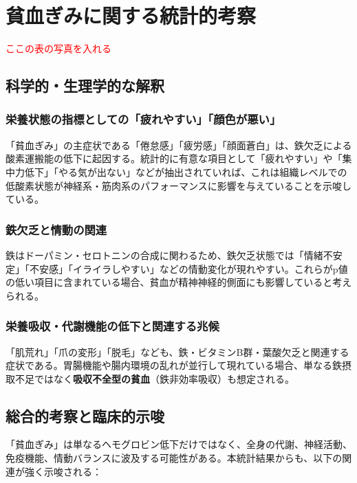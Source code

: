 \documentclass[a4paper,12pt]{article}
\begin{document}
\section{貧血ぎみに関する統計的考察}

\textcolor{red}{ここの表の写真を入れる}

\subsection*{科学的・生理学的な解釈}

\subsubsection*{栄養状態の指標としての「疲れやすい」「顔色が悪い」}

「貧血ぎみ」の主症状である「倦怠感」「疲労感」「顔面蒼白」は、鉄欠乏による酸素運搬能の低下に起因する。統計的に有意な項目として「疲れやすい」や「集中力低下」「やる気が出ない」などが抽出されていれば、これは組織レベルでの低酸素状態が神経系・筋肉系のパフォーマンスに影響を与えていることを示唆している。

\subsubsection*{鉄欠乏と情動の関連}

鉄はドーパミン・セロトニンの合成に関わるため、鉄欠乏状態では「情緒不安定」「不安感」「イライラしやすい」などの情動変化が現れやすい。これらがp値の低い項目に含まれている場合、貧血が精神神経的側面にも影響していると考えられる。

\subsubsection*{栄養吸収・代謝機能の低下と関連する兆候}

「肌荒れ」「爪の変形」「脱毛」なども、鉄・ビタミンB群・葉酸欠乏と関連する症状である。胃腸機能や腸内環境の乱れが並行して現れている場合、単なる鉄摂取不足ではなく\textbf{吸収不全型の貧血}（鉄非効率吸収）も想定される。

\subsection*{総合的考察と臨床的示唆}

「貧血ぎみ」は単なるヘモグロビン低下だけではなく、全身の代謝、神経活動、免疫機能、情動バランスに波及する可能性がある。本統計結果からも、以下の関連が強く示唆される：
\end{document}

